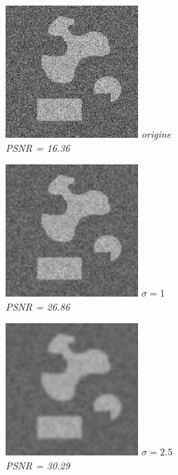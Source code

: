 \documentclass[a4,12pt]{article}
\begin{document}
\begin{center}
\begin{minipage}[c]{0.30\linewidth}
	\begin{center}
		\includegraphics[width = 50mm]{./img/2bb40.jpg}
		\textit{origine}\\
		\textit{PSNR = 16.36}
	\end{center}
\end{minipage}
\begin{minipage}[c]{0.30\linewidth}
	\begin{center}
		\includegraphics[width = 50mm]{./img/2bb40-1.jpg}
		\textit{$\sigma = 1$}\\
		\textit{PSNR = 26.86}
	\end{center}
\end{minipage}
\begin{minipage}[c]{0.30\linewidth}
	\begin{center}
		\includegraphics[width = 50mm]{./img/2bb40-2_5.jpg}
		\textit{$\sigma = 2.5$}\\
		\textit{PSNR = 30.29}
	\end{center}
\end{minipage}
\end{center}
\end{document}
